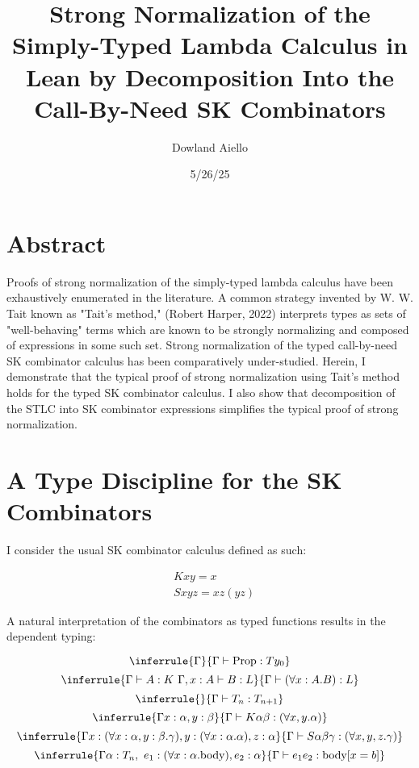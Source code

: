 \documentclass[11pt]{article}
\author{Dowland Aiello}
\date{5/26/25}
\title{Strong Normalization of the Simply-Typed Lambda Calculus in Lean by Decomposition Into the Call-By-Need SK Combinators}
\begin{document}
\maketitle
\tableofcontents

\section{Abstract}
\label{sec:org2b396dc}

Proofs of strong normalization of the simply-typed lambda calculus have been exhaustively enumerated in the literature. A common strategy invented by W. W. Tait known as "Tait's method," (Robert Harper, 2022) interprets types as sets of "well-behaving" terms which are known to be strongly normalizing and composed of expressions in some such set.
Strong normalization of the typed call-by-need SK combinator calculus has been comparatively under-studied. Herein, I demonstrate that the typical proof of strong normalization using Tait's method holds for the typed SK combinator calculus. I also show that decomposition of the STLC into SK combinator expressions simplifies the typical proof of strong normalization.
\section{A Type Discipline for the SK Combinators}
\label{sec:org56ceff1}

I consider the usual SK combinator calculus defined as such:

\begin{align}
& K xy = x \\
& S xyz = xz (yz)
\end{align}

A natural interpretation of the combinators as typed functions results in the dependent typing:

\label{inference:1}

\[
\inferrule
  { \Gamma  }
  { \Gamma \vdash \text{Prop} : Ty_{0} }
\]
\[
\inferrule
  { \Gamma \vdash A : K \ \Gamma,x : A \vdash B : L }
  { \Gamma \vdash (\forall x : A.B) : L}
\]
\[
\inferrule
  { }
  { \Gamma \vdash T_{n} : T_{n + 1} }
\]
\[
\inferrule
  { \Gamma x : \alpha, y : \beta }
  { \Gamma \vdash K \alpha \beta : (\forall x, y.\alpha) }
\]
\[
\inferrule
  { \Gamma x : (\forall x : \alpha, y : \beta.\gamma), y : (\forall x : \alpha.\alpha), z : \alpha }
  { \Gamma \vdash S \alpha \beta \gamma : (\forall x, y, z.\gamma) }
\]
\[
\inferrule
  { \Gamma \alpha : T_{n},\ e_{1} : (\forall x : \alpha.\text{body}), e_{2} : \alpha }
  { \Gamma \vdash e_{1} e_{2} : \text{body}[x = b] }
\]
\end{document}
